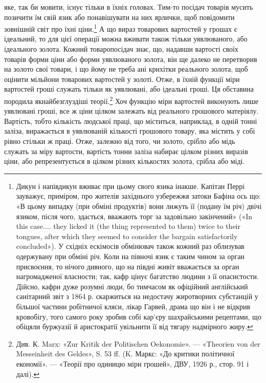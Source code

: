 \parcont{}  %
яке, так би мовити, існує тільки в їхніх головах. Тим-то посідач
товарів мусить позичити їм свій язик або понавішувати на них
ярлички, щоб повідомити зовнішній світ про їхні ціни.\footnote{
Дикун і напівдикун вживає при цьому свого язика інакше. Капітан
Перрі зауважує, приміром, про жителів західнього узбережжя затоки
Бафіна ось що: «В цьому випадку (при обміні продуктів) вони лижуть
її (подану їм річ) двічі язиком, після чого, здасться, вважають торг за задовільно
закінчений» («In this case.... they licked it (the thing represented
to them) twice to their tongues, after which they seemed to consider
the bargain satisfactorily concluded»). У східніх ескімосів обмінювач
також кожний раз облизував одержувану при обміні річ. Коли на півночі
язик є таким чином за орган присвоєння, то нічого дивного, що на
півдні живіт вважається за орган нагромадженої власности; так, кафр
цінує багатство людини з її опасистости. Дійсно, кафри дуже розумні
люди, бо тимчасом як офіційний англійський санітарний звіт з 1864 р.
скаржиться на недостачу жиротворних субстанцій у більшої частини робітничої
кляси, лікар Гарвей, драма що він і не відкрив кровобігу, того
самого року зробив собі кар’єру шахрайськими рецептами, що обіцяли
буржуазії й аристократії увільнити її від тягару надмірного жиру.
} А що
вираз товарових вартостей у грошах є ідеальний, то для цієї
операції можна вживати також тільки уявлюваного, або ідеального
золота. Кожний товаропосідач знає, що, надавши вартості
своїх товарів форми ціни або форми уявлюваного золота, він
ще далеко не перетворив на золото свої товари, і що йому не
треба ані крихітки реального золота, щоб оцінити мільйони
товарових вартостей у золоті. Отже, в їхній функції міри вартостей
гроші служать тільки як уявлювані, або ідеальні гроші.
Ця обставина породила якнайбезглуздіші теорії.\footnote{
Див. К. Marx: «Zur Kritik der Politischen Oekonomie». — «Theorien
von der Messeinheit des Geldes», S. 53 ff. (K. Маркс: «До критики
політичної економії». — «Теорії про одиницю міри грошей», ДВУ, 1926 р.,
стор. 91 і далі).
} Хоч функцію
міри вартостей виконують лише уявлювані гроші, все ж ціни
цілком залежать від реального грошового матеріялу. Вартість,
тобто кількість людської праці, що міститься, наприклад, в
одній тонні заліза, виражається в уявлюваній кількості грошового
товару, яка містить у собі рівно стільки ж праці. Отже,
залежно від того, чи золото, срібло або мідь служать за міру
вартости, вартість тонни заліза набирає цілком різних виразів
ціни, або репрезентується в цілком різних кількостях золота,
срібла або міді.


